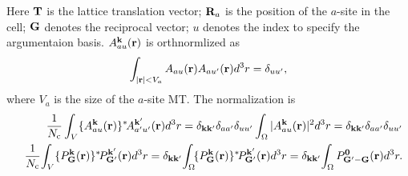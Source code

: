 \documentclass[a4paper,10pt,epsf,fleqn]{article}
\begin{document}
Here ${\bf T}$ is the lattice translation vector;
${\bf R}_a$ is the position of the $a$-site in the cell;
${\bf G}$ denotes the reciprocal vector; %
$u$ denotes the index to specify the argumentaion basis. 
$A^{\bf k}_{a u}({\bf r})$ is orthnormlized as
\begin{eqnarray}
\int_{|{\bf r}| < V_a} A_{a u}({\bf r})A_{a u'}({\bf r}) d^3r =\delta_{u u'},
\end{eqnarray}
where $V_a$ is the size of the $a$-site MT.
The normalization is
\begin{eqnarray}
&&
\frac{1}{N_{\rm c}}\int_V \{A^{\bf k}_{a u}({\bf r})\}^* 
\!A^{\bf k'}_{a' u'}({\bf r}) d^3r = 
\delta_{\bf k k'} \delta_{aa'}\delta_{u u'}
\int_\Omega |A^{\bf k}_{a u}({\bf r})|^2 d^3r
= \delta_{\bf k k'} \delta_{aa'}\delta_{u u'} \\
&&\frac{1}{N_{\rm c}}\!
\int_V  \{ P^{\bf k}_{\bf G}({\bf r})\}^*\!
P^{\bf k'}_{\bf G'}({\bf r})  d^3r
= \delta_{\bf k k'}\!
\int_\Omega \!\{ P^{\bf k}_{\bf G}({\bf r}) \}^*\!
P^{\bf k'}_{\bf G'}({\bf r})  d^3r
= \delta_{\bf k k'}\!
\int_\Omega  P^{\bf 0}_{\bf G'-G}({\bf r}) d^3r.
\end{eqnarray}


%


%
\end{document}
